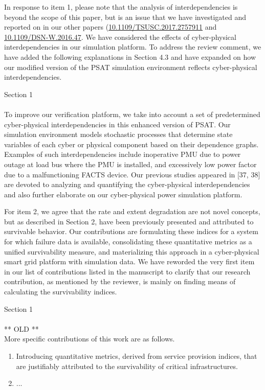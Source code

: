 \documentclass{article}
\newenvironment{response}{
  \doublespacing
  \setlength\parindent{0.05\linewidth}
  \ttfamily
}{}
\newenvironment{textblock}[1]
{\begin{tcolorbox}[breakable,enhanced]{#1 \\ \\}}
{\end{tcolorbox}}
\begin{document}
\begin{response}
In response to item 1, please note that the analysis of  interdependencies is beyond the scope of this paper, but is an issue that we have investigated and reported on in our other papers (\href{https://doi.org/10.1109/TSUSC.2017.2757911}{10.1109/TSUSC.2017.2757911} and \href{https://doi.org/10.1109/DSN-W.2016.47}{10.1109/DSN-W.2016.47}. We have considered the effects of cyber-physical interdependencies in our simulation platform. To address the review comment, we have added the following explanations in Section 4.3 and have expanded on how our modified version of the PSAT simulation environment reflects cyber-physical interdependencies.

\begin{textblock}{Section 1}
To improve our verification platform, we take into account a set of predetermined cyber-physical interdependencies in this enhanced version of PSAT. Our simulation environment models stochastic processes that determine state variables of each cyber or physical component based on their dependence graphs. Examples of such interdependencies include inoperative PMU due to power outage at load bus where the PMU is installed, and excessively low power factor due to a malfunctioning FACTS device. Our previous studies appeared in [37, 38] are devoted to analyzing and quantifying the cyber-physical interdependencies and also further elaborate on our cyber-physical power simulation platform.
\end{textblock}

For item 2, we agree that the rate and extent degradation are not novel concepts, but as described in Section 2, have been previously presented and attributed to survivable behavior. Our contributions are formulating these indices for a system for which failure data is available, consolidating these quantitative metrics as a unified survivability measure, and materializing this approach in a cyber-physical smart grid platform with simulation data. We have reworded the very first item in our list of contributions listed in the manuscript to clarify that our research contribution, as mentioned by the reviewer, is mainly on finding means of calculating the survivability indices.

\begin{textblock}{Section 1}
** OLD **\\
More specific contributions of this work are as follows.

\begin{enumerate}
  \item Introducing quantitative metrics, derived from service provision indices, that are justifiably attributed to the survivability of critical infrastructures.
  \item ...
\end{enumerate}


\end{textblock}
\end{response}
\end{document}
